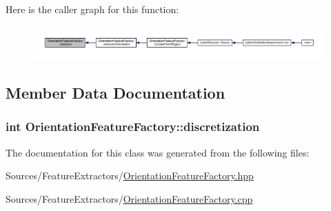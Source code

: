 Here is the caller graph for this function\+:\nopagebreak
\begin{figure}[H]
\begin{center}
\leavevmode
\includegraphics[width=350pt]{class_orientation_feature_factory_a68e87a390c95060cac05065757daa18d_icgraph}
\end{center}
\end{figure}




\subsection{Member Data Documentation}
\hypertarget{class_orientation_feature_factory_abcd8932fe77877dff6657e4070882015}{
\subsubsection[{discretization}]{\setlength{\rightskip}{0pt plus 5cm}int Orientation\+Feature\+Factory\+::discretization\hspace{0.3cm}{\ttfamily [private]}}}\label{class_orientation_feature_factory_abcd8932fe77877dff6657e4070882015}


The documentation for this class was generated from the following files\+:\begin{DoxyCompactItemize}
\item 
Sources/\+Feature\+Extractors/\hyperlink{_orientation_feature_factory_8hpp}{Orientation\+Feature\+Factory.\+hpp}\item 
Sources/\+Feature\+Extractors/\hyperlink{_orientation_feature_factory_8cpp}{Orientation\+Feature\+Factory.\+cpp}\end{DoxyCompactItemize}
